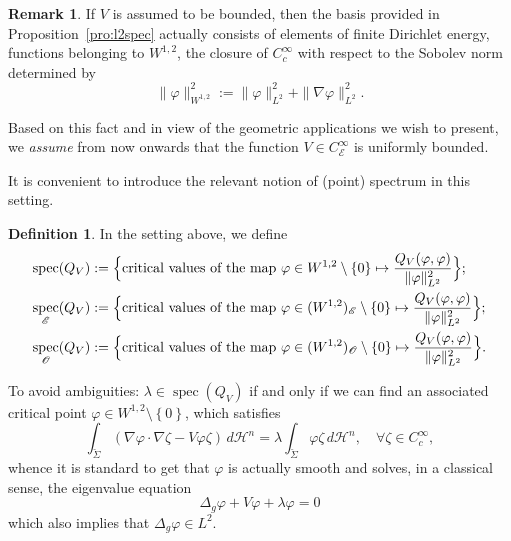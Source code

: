 \documentclass[JEP,XML,SOM,Unicode]{cedram}
\let\mathcal\mathscr
\DeclareMathOperator{\spec}{spec}
\theoremstyle{definition}
\newtheorem{definition}[thm]{Definition}
\newtheorem{rmk}[thm]{Remark}
\newcommand{\h}{\mathscr{H}}
\begin{document}
\begin{rmk}\label{rmk:Vbounded} If $V$ is assumed to be bounded, then the basis provided in Proposition~\ref{pro:l2spec} actually consists of elements of finite Dirichlet energy, \ie functions belonging to $W^{1,2}$, the closure of $C^{\infty}_c$ with respect to the Sobolev norm determined by
\begin{equation}\label{eq:SobNorm}
\|\varphi\|^2_{W^{1,2}}:= \|\varphi\|^2_{L^2}+\|\nabla \varphi\|^2_{L^2}.
\end{equation}
\end{rmk}

Based on this fact and in view of the geometric applications we wish to present, we \emph{assume} from now onwards that the function $V\in C^{\infty}_{\mathcal{E}}$ is uniformly bounded.

It is convenient to introduce the relevant notion of (point) spectrum in this setting.

\begin{definition}\label{def:spec} In the setting above, we define
\begin{align*}
\spec(Q_V)&:=\Bigl\{\text{critical values of the map} \ \varphi\in W^{1,2}\setminus \left\{0\right\} \mapsto \frac{Q_V(\varphi,\varphi)}{\|\varphi\|^2_{L^2}} \Bigr\};\\
\spec_{\mathcal{E}} (Q_V)&:= \Bigl\{\text{critical values of the map} \ \varphi\in (W^{1,2})_{\mathcal{E}}\setminus \left\{0\right\} \mapsto \frac{Q_V(\varphi,\varphi)}{\|\varphi\|^2_{L^2}} \Bigr\};\\
\spec_{\mathcal{O}} (Q_V)&:= \Bigl\{\text{critical values of the map} \ \varphi\in (W^{1,2})_{\mathcal{O}}\setminus \left\{0\right\} \mapsto \frac{Q_V(\varphi,\varphi)}{\|\varphi\|^2_{L^2}} \Bigr\}.
\end{align*}
\end{definition}
To avoid ambiguities: $\lambda\in \spec(Q_V)$ if and only if we can find an associated critical point $\varphi \in W^{1,2}\setminus\left\{0\right\}$, which satisfies
\begin{equation}\label{eq:weak}
\int_{\check{\Sigma}}(\nabla \varphi \cdot \nabla\zeta -V\varphi\zeta)\,d\h^n = \lambda \int_{\check{\Sigma}}\varphi\zeta\,d\h^n, \quad \forall \zeta\in C^{\infty}_c,
\end{equation}
whence it is standard to get that $\varphi$ is actually smooth and solves, in a classical sense, the eigenvalue equation
\[
\Delta_g \varphi+V\varphi+\lambda\varphi=0
\]
which also implies that $\Delta_g\varphi \in L^2$.
\end{document}
